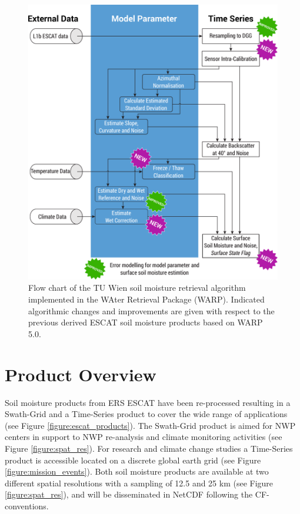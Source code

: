 \documentclass[a4paper,twocolumn]{esapub2005} %
\begin{document}
\begin{figure}
  \centering
  \includegraphics[width=1.\linewidth]{../poster/figures/WARP_processing_steps.pdf}
  \caption{Flow chart of the TU Wien soil moisture retrieval algorithm implemented in the WAter Retrieval Package (WARP). Indicated algorithmic changes and improvements are given with respect to the previous derived ESCAT soil moisture products based on WARP 5.0.\label{figure:flow_chart}}
\end{figure}  

\section{Product Overview}
Soil moisture products from ERS ESCAT have been re-processed resulting in a Swath-Grid and a Time-Series product to cover the wide range of applications (see Figure \ref{figure:escat_products}).
The Swath-Grid product is aimed for NWP centers in support to NWP re-analysis and climate monitoring activities (see Figure \ref{figure:spat_res}).
For research and climate change studies a Time-Series product is accessible located on a discrete global earth grid (see Figure \ref{figure:mission_events}).
Both soil moisture products are available at two different spatial resolutions with a sampling of 12.5 and 25 km (see Figure \ref{figure:spat_res}), and will be disseminated in NetCDF following the CF-conventions.\\
\end{document}
